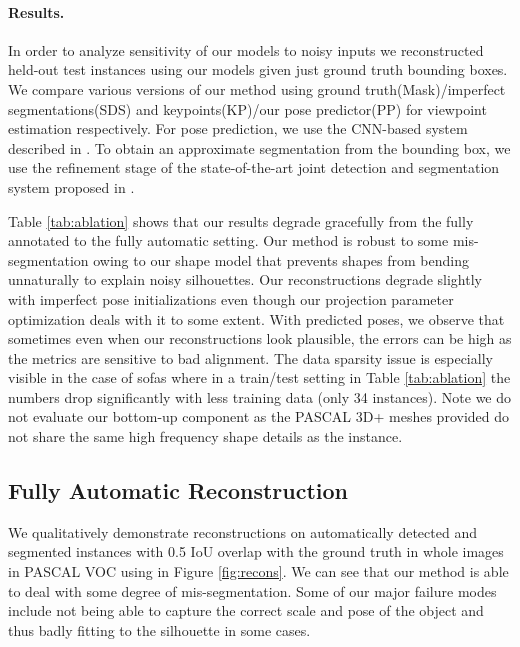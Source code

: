 \paragraph{Results.}
In order to analyze sensitivity of our models to noisy inputs we reconstructed held-out test instances using our models given just ground truth bounding boxes. We compare various versions of our method using ground truth(Mask)/imperfect segmentations(SDS) and keypoints(KP)/our pose predictor(PP) for viewpoint estimation respectively. For pose prediction, we use the CNN-based system described in \cite{ShubhamPose}. To obtain an approximate segmentation from the bounding box, we use the refinement stage of the state-of-the-art joint detection and segmentation system proposed in \cite{BharathECCV2014}. 

Table \ref{tab:ablation} shows that our results degrade gracefully from the fully annotated to the fully automatic setting. Our method is robust to some mis-segmentation owing to our shape model that prevents shapes from bending unnaturally to explain noisy silhouettes. Our reconstructions degrade slightly with imperfect pose initializations even though our projection parameter optimization deals with it to some extent. With predicted poses, we observe that sometimes even when our reconstructions look plausible, the errors can be high as the metrics are sensitive to bad alignment. The data sparsity issue is especially visible in the case of sofas where in a train/test setting in Table \ref{tab:ablation} the numbers drop significantly with less training data (only 34 instances). Note we do not evaluate our bottom-up component as the PASCAL 3D+ meshes provided do not share the same high frequency shape details as the instance.

\subsection{Fully Automatic Reconstruction}
We qualitatively demonstrate reconstructions on automatically detected and segmented instances with 0.5 IoU overlap with the ground truth in whole images in PASCAL VOC using \cite{BharathECCV2014} in Figure \ref{fig:recons}. We can see that our method is able to deal with some degree of mis-segmentation. Some of our major failure modes include not being able to capture the correct scale and pose of the object and thus badly fitting to the silhouette in some cases.

